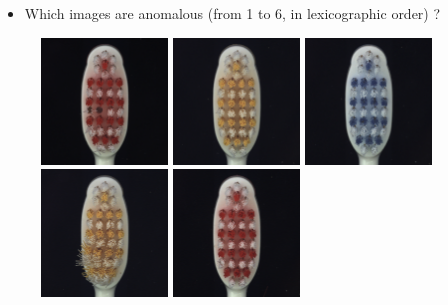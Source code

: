 \documentclass[xcolor=pdftex,dvipsnames,table,mathserif]{beamer}
\begin{document}
\begin{frame}{}

  \begin{itemize}
  \item Which images are anomalous (from 1 to 6, in lexicographic order) ?
  \end{itemize}

  \begin{figure}[ht]
    \centering
    \includegraphics[width=0.3\textwidth]{mvtec_tb_def_011}
    \includegraphics[width=0.3\textwidth]{mvtec_tb_good_010}
    \includegraphics[width=0.3\textwidth]{mvtec_tb_good_002}
    \includegraphics[width=0.3\textwidth]{mvtec_tb_def_025}
    \includegraphics[width=0.3\textwidth]{mvtec_tb_good_006}

\end{figure}
\end{frame}
\end{document}
